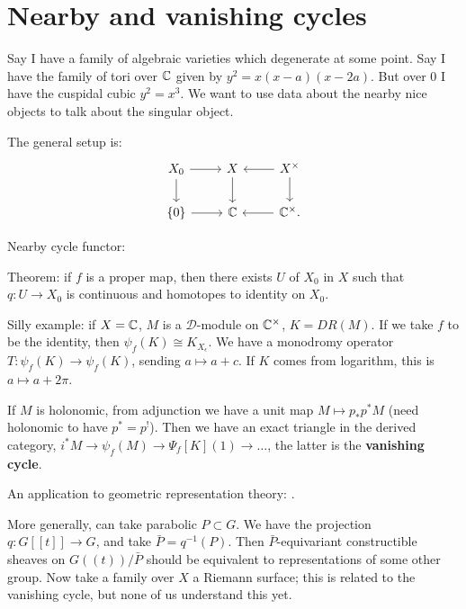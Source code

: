 \section{Nearby and vanishing cycles}
Say I have a family of algebraic varieties which degenerate at some point. Say I have the family of tori over $\mathbb C$ given by
$y^2 = x(x-a)(x-2a)$. But over 0 I have the cuspidal cubic $y^2 = x^3$. We want to use data about the nearby nice objects to
talk about the singular object.

The general setup is:
\[
\begin{tikzcd}
X_0\arrow{r}\arrow{d} & X \arrow{d} & X^{\times} \arrow{l}\arrow{d} \\
\{0\} \arrow{r} & \C & \C^{\times} \arrow{l}.
\end{tikzcd}
\]

Nearby cycle functor: 

Theorem: if $f$ is a proper map, then there exists $U$ of $X_0$ in $X$ such that $q:U \to X_0$ is continuous and homotopes to
identity on $X_0$. 


Silly example: if $X = \mathbb C$, $M$ is a $\mathcal{D}$-module on $\mathbb C^{\times}$, $K = DR(M)$. If we take $f$ to be the identity, then
$\psi_f(K) \cong K_{X_{\epsilon}}$. We have a monodromy operator $T: \psi_f(K) \to \psi_f(K)$, sending $a \mapsto a + c$.
If $K$ comes from logarithm, this is $a \mapsto a + 2\pi$. 

If $M$ is holonomic, from adjunction we have a unit map $M \mapsto p_* p^* M$ (need holonomic to have $p^* = p^!$).
Then we have an exact triangle in the derived category, $i^*M \to \psi_f(M) \to \Psi_f[K](1) \to \dots$, the 
latter is the \textbf{vanishing cycle}.

An application to geometric representation theory: .

More generally, can take parabolic $P \subset G$. We have the projection $q: G[[t]] \to G$, and take $\bar P = q^{-1}(P)$.
Then $\bar P$-equivariant constructible sheaves on $G((t))/\bar P$ should be equivalent to representations of some other group.
Now take a family over $X$ a Riemann surface; this is related to the vanishing cycle, but none of us understand this yet.

